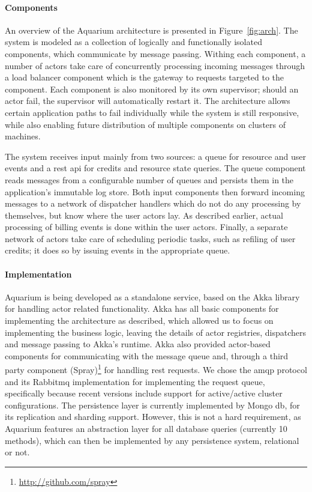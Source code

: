 \paragraph{Components} An overview of the Aquarium architecture is presented in
Figure~\ref{fig:arch}.  The system is modeled as a collection of logically and
functionally isolated components, which communicate by message passing. Withing
each component, a number of actors take care of concurrently processing
incoming messages through a load balancer component which is the gateway to
requests targeted to the component. Each component is also monitored by its own
supervisor; should an actor fail, the supervisor will automatically restart it.
The architecture allows certain application paths to fail individually while
the system is still responsive, while also enabling future distribution of
multiple components on clusters of machines.

The system receives input mainly from two sources: a queue for resource and
user events and a {\sc rest api} for credits and resource state queries. The queue component
reads messages from a configurable number of queues and persists them in the
application's immutable log store. Both input components then forward incoming
messages to a network of dispatcher handlers which do not do any processing by
themselves, but know where the user actors lay. As described earlier, actual
processing of billing events is done within the user actors. Finally, a
separate network of actors take care of scheduling periodic tasks, such as
refiling of user credits; it does so by issuing events in the appropriate
queue.

\paragraph{Implementation}

Aquarium is being developed as a standalone service, based on the Akka library
for handling actor related functionality. Akka has all basic components for
implementing the architecture as described, which allowed us to focus on
implementing the business logic, leaving the details of actor registries,
dispatchers and message passing to Akka's runtime. Akka also provided
actor-based components for communicating with the message queue and, through a
third party component (Spray)\footnote{\url{http://github.com/spray}} for
handling {\sc rest} requests.  We chose the {\sc amqp} protocol and its
Rabbit{\sc mq} implementation for implementing the request queue, specifically
because recent versions include support for active/active cluster
configurations. The persistence layer is currently implemented by Mongo{\sc
db}, for its replication and sharding support.  However, this is not a hard
requirement, as Aquarium features an abstraction layer for all database queries
(currently 10 methods), which can then be implemented by any persistence
system, relational or not.
